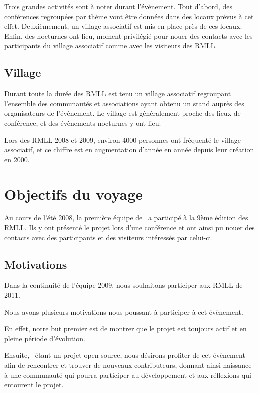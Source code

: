 \documentclass{rtxreport}
\begin{document}
Trois grandes activités sont à noter durant l'évènement. Tout d'abord, des
conférences regroupées par thème vont être données dans des locaux prévus à cet
effet. Deuxièmement, un village associatif est mis en place près de ces locaux.
Enfin, des nocturnes ont lieu, moment privilégié pour nouer des contacts avec
les participants du village associatif comme avec les visiteurs des RMLL.


\section{Village}

Durant toute la durée des RMLL est tenu un village associatif regroupant
l'ensemble des communautés et associations ayant obtenu un stand auprès des
organisateurs de l'évènement. Le village est généralement proche des lieux de
conférence, et des évènements nocturnes y ont lieu.

Lors des RMLL 2008 et 2009, environ 4000 personnes ont fréquenté le village
associatif, et ce chiffre est en augmentation d'année en année depuis leur
création en 2000.


\chapter{Objectifs du voyage}

Au cours de l'été 2008, la première équipe de \rtx\ a participé à la 9ème
édition des RMLL. Ils y ont présenté le projet lors d'une conférence et ont
ainsi pu nouer des contacts avec des participants et des visiteurs intéressés
par celui-ci.

\section{Motivations}

Dans la continuité de l'équipe 2009, nous souhaitons participer aux RMLL de
2011.

Nous avons plusieurs motivations nous poussant à participer à cet évènement.

En effet, notre but premier est de montrer que le projet est toujours actif et
en pleine période d'évolution.

Ensuite, \rtx\ étant un projet open-source,
nous désirons profiter de cet évènement afin de rencontrer et trouver de
nouveaux contributeurs, donnant ainsi naissance à une communauté qui pourra
participer au développement
et aux réflexions qui entourent le projet.
\end{document}
